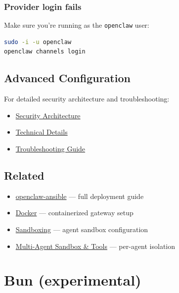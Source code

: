 \subsubsection{Provider login fails}


Make sure you're running as the \texttt{openclaw} user:

\begin{lstlisting}[language=bash]
sudo -i -u openclaw
openclaw channels login
\end{lstlisting}


\subsection{Advanced Configuration}


For detailed security architecture and troubleshooting:

\begin{itemize}
  \item \href{https://github.com/openclaw/openclaw-ansible/blob/main/docs/security.md}{Security Architecture}
  \item \href{https://github.com/openclaw/openclaw-ansible/blob/main/docs/architecture.md}{Technical Details}
  \item \href{https://github.com/openclaw/openclaw-ansible/blob/main/docs/troubleshooting.md}{Troubleshooting Guide}
\end{itemize}


\subsection{Related}


\begin{itemize}
  \item \href{https://github.com/openclaw/openclaw-ansible}{openclaw-ansible} — full deployment guide
  \item \href{/install/docker}{Docker} — containerized gateway setup
  \item \href{/gateway/sandboxing}{Sandboxing} — agent sandbox configuration
  \item \href{/tools/multi-agent-sandbox-tools}{Multi-Agent Sandbox \& Tools} — per-agent isolation
\end{itemize}



\clearpage

\section{Bun (experimental)}


